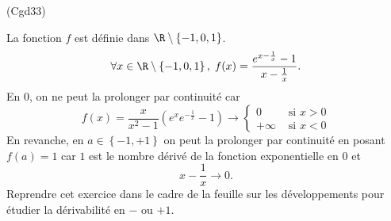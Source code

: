 \begin{tiny}(Cgd33)\end{tiny} La fonction $f$ est définie dans $\R \setminus\left\lbrace -1, 0, 1\right\rbrace$. 
\[
 \forall x \in \R \setminus\left\lbrace -1, 0, 1\right\rbrace,\;
f(x) = \frac{e^{x-\frac{1}{x}}-1}{x-\frac{1}{x}}.
\]
En $0$, on ne peut la prolonger par continuité car
\begin{displaymath}
 f(x) = \frac{x}{x^2 - 1}\left( e^{x} e^{-\frac{1}{x}} - 1 \right)
 \rightarrow
 \left\lbrace 
 \begin{aligned}
  0 &\text{ si } x > 0 \\
  +\infty &\text{ si } x < 0
 \end{aligned}
\right.  
\end{displaymath}
En revanche, en $a\in\left\lbrace -1,+1\right\rbrace$ on peut la prolonger par continuité en posant $f(a) = 1$ car $1$ est le nombre dérivé de la fonction exponentielle en $0$ et 
\[
 x - \frac{1}{x} \rightarrow 0.
\]
Reprendre cet exercice dans le cadre de la feuille sur les développements pour étudier la dérivabilité en $-$ ou $+1$.